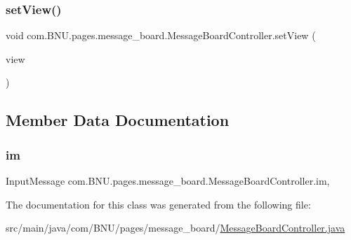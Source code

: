 \subsubsection{\texorpdfstring{set\+View()}{setView()}}
{\footnotesize\ttfamily void com.\+B\+N\+U.\+pages.\+message\+\_\+board.\+Message\+Board\+Controller.\+set\+View (\begin{DoxyParamCaption}\item[{\mbox{\hyperlink{classcom_1_1_b_n_u_1_1pages_1_1message__board_1_1_message_board_view}{Message\+Board\+View}}}]{view }\end{DoxyParamCaption})}



\subsection{Member Data Documentation}
\mbox{\label{classcom_1_1_b_n_u_1_1pages_1_1message__board_1_1_message_board_controller_ac879478adf7586da5991d674d09f1738}} 
\subsubsection{\texorpdfstring{im}{im}}
{\footnotesize\ttfamily Input\+Message com.\+B\+N\+U.\+pages.\+message\+\_\+board.\+Message\+Board\+Controller.\+im\hspace{0.3cm}{\ttfamily [static]}, {\ttfamily [private]}}



The documentation for this class was generated from the following file\+:\begin{DoxyCompactItemize}
\item 
src/main/java/com/\+B\+N\+U/pages/message\+\_\+board/\mbox{\hyperlink{_message_board_controller_8java}{Message\+Board\+Controller.\+java}}\end{DoxyCompactItemize}
